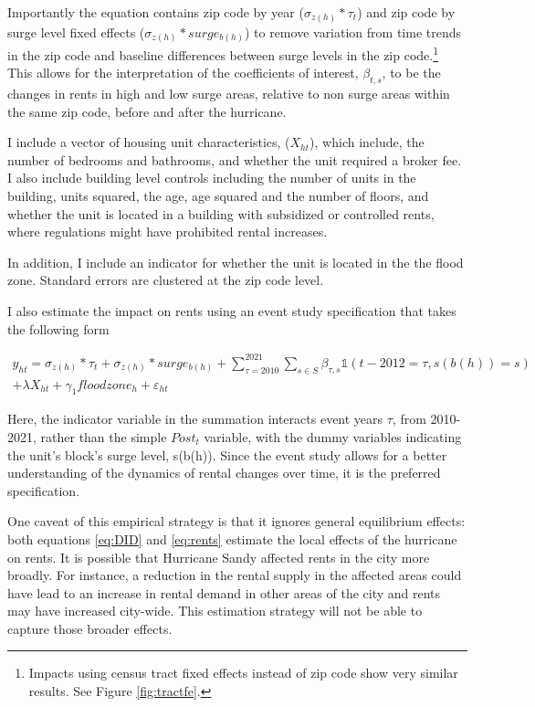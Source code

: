 \documentclass[12pt]{article}
\begin{document}
{{{{  Importantly the equation contains zip code by year ($\sigma_{z(h)}\ast\tau_t$) and zip code by surge level fixed effects  ($\sigma_{z(h)}\ast surge_{b(h)}$) to remove variation from time trends in the zip code and baseline differences between surge levels in the zip code.\footnote{Impacts using census tract fixed effects instead of zip code show very similar results. See Figure \ref{fig:tractfe}.}  This allows for the interpretation of the coefficients of interest, $\beta_{t, s}$, to be the changes in rents in high and low surge areas, relative to non surge areas within the same zip code, before and after the hurricane. 
  
   I include a vector of housing unit characteristics, ($X_{ht}$), which include, the number of bedrooms and bathrooms, and whether the unit required a broker fee.  I also include building level controls including the number of units in the building, units squared, the age, age squared and the number of floors, and whether the unit is located in a building with subsidized or controlled rents, where regulations might have prohibited rental increases. 
   
  In addition, I include an indicator for whether the unit is located in the the flood zone.  Standard errors are clustered at the zip code level.
  
I also estimate the impact on rents using an event study specification that takes the following form

\begin{equation}
\label{eq:rents}
\begin{split}
y_{ht}= \sigma_{z(h)}\ast\tau_t+\sigma_{z(h)}\ast surge_{b(h)}  + \sum_{\tau=2010}^{2021}\sum_{s\in S}{\beta_{\tau,s}\mathbb{1}}\left(t-2012=\tau,s\left(b(h)\right)=s\right) \\ + \lambda X_{ht}+\gamma_{1}floodzone_h+ \varepsilon_{ht}
\end{split}
\end{equation}

Here, the indicator variable in the summation interacts event years $\tau$, from 2010-2021, rather than the simple $Post_{t}$ variable, with the dummy variables indicating the unit's block's surge level, s(b(h)). Since the event study allows for a better understanding of the dynamics of rental changes over time, it is the preferred specification. 

One caveat of this empirical strategy is that it ignores general equilibrium effects: both equations \ref{eq:DID} and \ref{eq:rents} estimate the local effects of the hurricane on rents.  It is possible that Hurricane Sandy affected rents in the city more broadly.  For instance, a reduction in the rental supply in the affected areas could have lead to an increase in rental demand in other areas of the city and rents may have increased city-wide. This estimation strategy will not be able to capture those broader effects.  

}}}}
\end{document}
